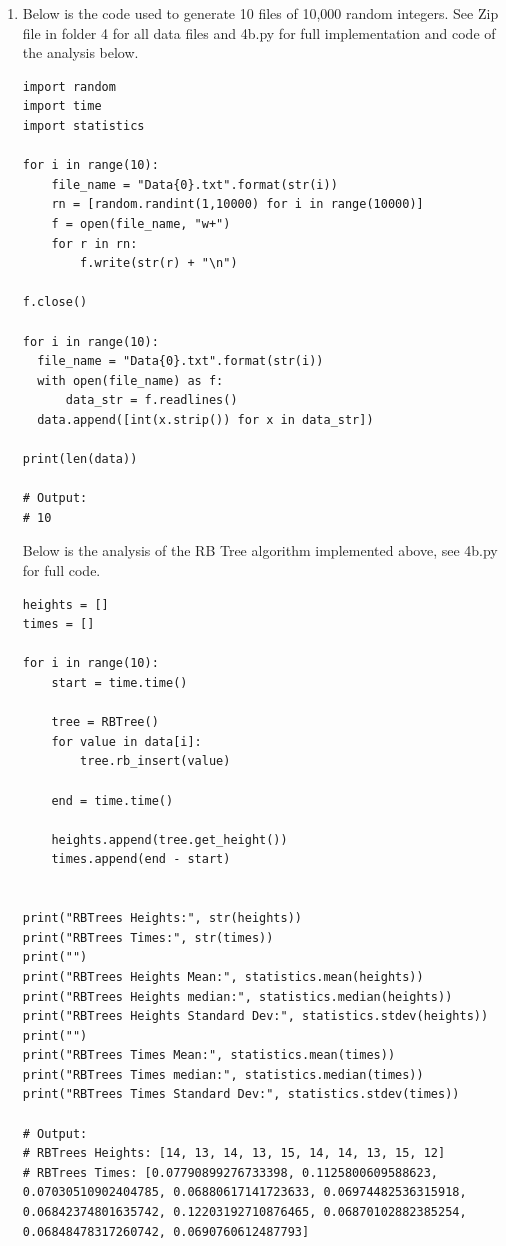 \documentclass{article}
\begin{document}
\begin{enumerate}
\begin{enumerate}
      \item Below is the code used to generate 10 files of 10,000 random integers. See Zip file in folder 4 for all data files and 4b.py for full implementation and code of the analysis below.
      
      \begin{lstlisting}
import random
import time
import statistics

for i in range(10):
    file_name = "Data{0}.txt".format(str(i))
    rn = [random.randint(1,10000) for i in range(10000)]
    f = open(file_name, "w+")
    for r in rn: 
        f.write(str(r) + "\n")

f.close()

for i in range(10):
  file_name = "Data{0}.txt".format(str(i))
  with open(file_name) as f:
      data_str = f.readlines()
  data.append([int(x.strip()) for x in data_str])

print(len(data))

# Output:
# 10
      \end{lstlisting}

      Below is the analysis of the RB Tree algorithm implemented above, see 4b.py for full code. 

      \begin{lstlisting}
heights = []
times = []

for i in range(10):
    start = time.time()
    
    tree = RBTree()
    for value in data[i]:
        tree.rb_insert(value)
    
    end = time.time()
    
    heights.append(tree.get_height())
    times.append(end - start)

    
print("RBTrees Heights:", str(heights))
print("RBTrees Times:", str(times))
print("")
print("RBTrees Heights Mean:", statistics.mean(heights))
print("RBTrees Heights median:", statistics.median(heights))
print("RBTrees Heights Standard Dev:", statistics.stdev(heights))
print("")
print("RBTrees Times Mean:", statistics.mean(times))
print("RBTrees Times median:", statistics.median(times))
print("RBTrees Times Standard Dev:", statistics.stdev(times))

# Output:
# RBTrees Heights: [14, 13, 14, 13, 15, 14, 14, 13, 15, 12]
# RBTrees Times: [0.07790899276733398, 0.1125800609588623, 0.07030510902404785, 0.06880617141723633, 0.06974482536315918, 0.06842374801635742, 0.12203192710876465, 0.06870102882385254, 0.06848478317260742, 0.0690760612487793]


\end{lstlisting}
\end{enumerate}
\end{enumerate}
\end{document}
